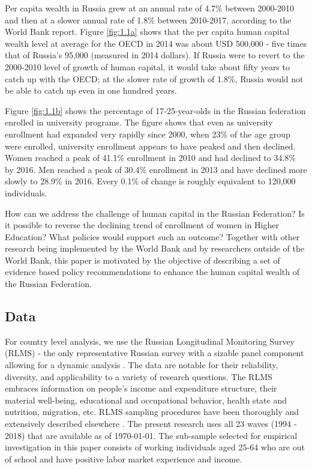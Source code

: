 \documentclass[12pt,a4paper]{article}
\numberwithin{equation}{section}
\begin{document}
\vspace{-2em}

Per capita wealth in Russia grew at an annual rate of 4.7\% between 2000-2010 and then at a slower annual rate of 1.8\% between 2010-2017, according to the World Bank report. Figure \ref{fig:1.1a}  shows that the per capita human capital wealth level at average for the OECD in 2014 was about USD 500,000 - five times that of Russia's 95,000 (measured in 2014 dollars). If Russia were to revert to the 2000-2010 level of growth of human capital, it would take about fifty years to catch up with the OECD; at the slower rate of growth of 1.8\%, Russia would not be able to catch up even in one hundred years. 

Figure \ref{fig:1.1b}  shows the percentage of 17-25-year-olds in the Russian federation enrolled in university programs. The figure shows that even as university enrollment had expanded very rapidly since 2000, when 23\% of the age group were enrolled, university enrollment appears to have peaked and then declined. Women reached a peak of 41.1\% enrollment in 2010 and had declined to 34.8\% by 2016. Men reached a peak of 30.4\% enrollment in 2013 and have declined more slowly to 28.9\% in 2016. Every 0.1\% of change is roughly equivalent to 120,000 individuals. 

How can we address the challenge of human capital in the Russian Federation? Is it possible to reverse the declining trend of enrollment of women in Higher Education? What policies would support such an outcome? Together with other research being implemented  by the World Bank and by researchers outside of the World Bank, this paper is motivated by the objective of describing a set of evidence based policy recommendations to enhance the human capital wealth of the Russian Federation. 
 
\subsection{Data}

For country level analysis, we use the Russian Longitudinal Monitoring Survey (RLMS) - the only representative Russian survey with a sizable panel component allowing for a dynamic analysis \parencite{kozyreva_081._2015}. The data are notable for their reliability, diversity, and applicability to a variety of research questions. The RLMS embraces information on people's income and expenditure structure, their material well-being, educational and occupational behavior, health state and nutrition, migration, etc.  RLMS sampling procedures have been thoroughly and extensively described elsewhere \parencite{kozyreva_081._2015}. The present research uses all 23 waves (1994 - 2018) that are available as of \today. The sub-sample selected for empirical investigation in this paper consists of working individuals aged 25-64 who are out of school and have positive labor market experience and income. 
\\
\end{document}

